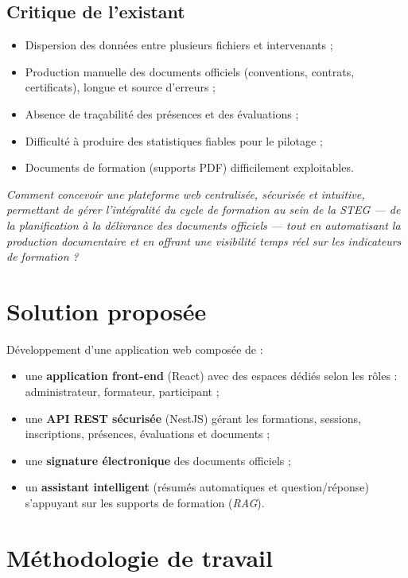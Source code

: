 \documentclass[12pt,a4paper]{report}
\begin{document}
\subsection{Critique de l'existant}
\begin{itemize}
  \item Dispersion des données entre plusieurs fichiers et intervenants ;
  \item Production manuelle des documents officiels (conventions,
    contrats, certificats), longue et source d'erreurs ;
  \item Absence de traçabilité des présences et des évaluations ;
  \item Difficulté à produire des statistiques fiables pour le pilotage ;
  \item Documents de formation (supports PDF) difficilement exploitables.
\end{itemize}

\begin{tcolorbox}[colback=blue!5,colframe=blue!40!black,title=Problématique]
\itshape Comment concevoir une plateforme web centralisée, sécurisée et
intuitive, permettant de gérer l'intégralité du cycle de formation au sein de
la STEG — de la planification à la délivrance des documents officiels — tout
en automatisant la production documentaire et en offrant une visibilité
temps réel sur les indicateurs de formation ?
\end{tcolorbox}

\section{Solution proposée}
Développement d'une application web composée de :
\begin{itemize}
  \item une \textbf{application front-end} (React) avec des espaces dédiés
    selon les rôles : administrateur, formateur, participant ;
  \item une \textbf{API REST sécurisée} (NestJS) gérant les formations,
    sessions, inscriptions, présences, évaluations et documents ;
  \item une \textbf{signature électronique} des documents officiels ;
  \item un \textbf{assistant intelligent} (résumés automatiques et
    question/réponse) s'appuyant sur les supports de formation (\emph{RAG}).
\end{itemize}

\section{Méthodologie de travail}
\end{document}
